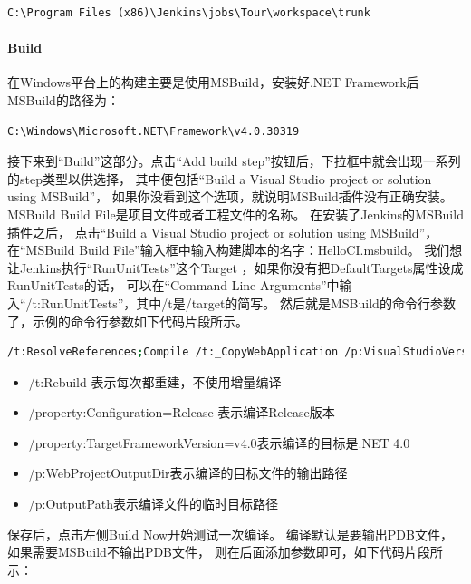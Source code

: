 \documentclass{book}
\begin{document}
\begin{lstlisting}
C:\Program Files (x86)\Jenkins\jobs\Tour\workspace\trunk
\end{lstlisting}

\paragraph{Build}

在Windows平台上的构建主要是使用MSBuild，安装好.NET Framework后MSBuild的路径为：

\begin{lstlisting}
C:\Windows\Microsoft.NET\Framework\v4.0.30319
\end{lstlisting}接下来到“Build”这部分。点击“Add build step”按钮后，下拉框中就会出现一系列的step类型以供选择，
其中便包括“Build a Visual Studio project or solution using MSBuild”，
如果你没看到这个选项，就说明MSBuild插件没有正确安装。
MSBuild Build File是项目文件或者工程文件的名称。
在安装了Jenkins的MSBuild插件之后，
点击“Build a Visual Studio project or solution using MSBuild”，
在“MSBuild Build File”输入框中输入构建脚本的名字：HelloCI.msbuild。
我们想让Jenkins执行“RunUnitTests”这个Target ，如果你没有把DefaultTargets属性设成RunUnitTests的话，
可以在“Command Line Arguments”中输入“/t:RunUnitTests”，其中/t是/target的简写。
然后就是MSBuild的命令行参数了，示例的命令行参数如下代码片段所示。

\begin{lstlisting}[language=Bash]
/t:ResolveReferences;Compile /t:_CopyWebApplication /p:VisualStudioVersion=12.0 /p:Configuration=Release /property:TargetFrameworkVersion=v4.0 /p:WebProjectOutputDir=E:\Web\RR.Web.CCN.Tour\1.0.1 /p:OutputPath=E:\JenkinsPublish\Bin
\end{lstlisting}

\begin{itemize}
\item{/t:Rebuild 表示每次都重建，不使用增量编译}
\item{/property:Configuration=Release 表示编译Release版本}
\item{/property:TargetFrameworkVersion=v4.0表示编译的目标是.NET 4.0}
\item{/p:WebProjectOutputDir表示编译的目标文件的输出路径}
\item{/p:OutputPath表示编译文件的临时目标路径}
\end{itemize}

保存后，点击左侧Build Now开始测试一次编译。
编译默认是要输出PDB文件，如果需要MSBuild不输出PDB文件，
则在后面添加参数即可，如下代码片段所示：
\end{document}
